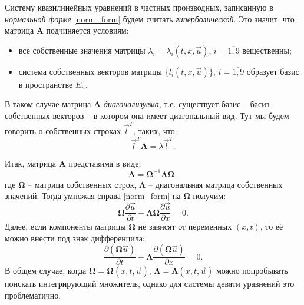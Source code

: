 	Систему квазилинейных уравнений в частных производных, записанную в \textit{нормальной форме} \eqref{norm_form} будем считать \textit{гиперболической}.
	Это значит, что матрица $\mathbf{A}$ подчиняется условиям\cite{rozhdestvenskiy}:
\begin{itemize}
	\item все собственные значения матрицы $\lambda_{i} = \lambda_{i}(t, x, \vec{u})$, $i = \overline{1, 9}$ вещественны;
	\item система собственных векторов матрицы $\{l_{i}(t, x, \vec{u})\}$, $i = \overline{1, 9}$ образует базис в пространстве $E_{n}$.
\end{itemize}

	В таком случае матрица $\mathbf{A}$ \textit{диагонализуема}, т.е. существует базис -- басиз собственных векторов -- в котором она имеет диагональный вид.
	Тут мы будем говорить о собственных строках $\vec{l}^{T}$, таких, что:
\begin{equation}
	\label{eigenstr_equation}
	\vec{l}^{T}\mathbf{A} = \lambda\vec{l}^{T}.
\end{equation}
	
	Итак, матрица $\mathbf{A}$ представима в виде:
\begin{equation}
	\label{diagonal_view}
	\mathbf{A} = \mathbf{\Omega}^{-1}\mathbf{\Lambda}\mathbf{\Omega},
\end{equation}	
	где $\mathbf{\Omega}$ -- матрица собственных строк, $\mathbf{\Lambda}$ -- диагональная матрица собственных значений.
	Тогда умножая справа \eqref{norm_form} на $\mathbf{\Omega}$ получим:
\begin{equation}
	\label{norm_form1}
	\mathbf{\Omega}\frac{\partial\vec{u}}{\partial{t}}+\mathbf{\Lambda}\mathbf{\Omega}\frac{\partial\vec{u}}{\partial{x}} = 0.
\end{equation}
	Далее, если компоненты матрицы $\mathbf{\Omega}$ не зависят от переменных $(x, t)$, то её можно внести под знак дифференцила:
\begin{equation}
	\label{norm_form2}
	\frac{\partial(\mathbf{\Omega}\vec{u})}{\partial{t}}+\mathbf{\Lambda}\frac{\partial(\mathbf{\Omega}\vec{u})}{\partial{x}} = 0.
\end{equation}
	В общем случае, когда $\mathbf{\Omega} = \mathbf{\Omega}(x, t, \vec{u})$, $\mathbf{\Lambda} = \mathbf{\Lambda}(x, t, \vec{u})$ можно попробывать поискать интегрирующий множитель, однако для системы девяти уравнений это проблематично.
	
